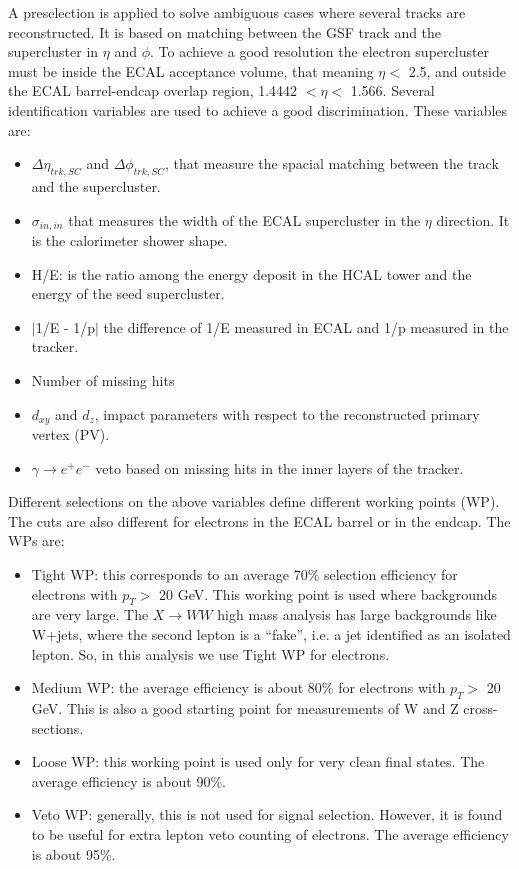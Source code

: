 A preselection is applied to solve ambiguous cases where several tracks are reconstructed. It is based on matching
between the GSF track and the supercluster in $\eta$ and $\phi$. To achieve a good resolution the electron supercluster must
be inside the ECAL acceptance volume, that meaning  $\eta<$ 2.5, and outside the ECAL barrel-endcap
overlap region, 1.4442 $<\eta<$ 1.566.
Several identification variables are used to achieve a good discrimination. These variables are:
\begin{itemize}
\item $\Delta \eta_{trk,SC}$ and $\Delta \phi_{trk,SC}$, that measure the spacial matching between the track
and the supercluster.
\item $\sigma_{in,in}$ that measures the width of the ECAL supercluster in the $\eta$ direction. It is the calorimeter shower shape.
\item H/E: is the ratio among the energy deposit in the HCAL tower and the energy of the seed supercluster.
\item $|$1/E - 1/p$|$ the difference of 1/E measured in ECAL and 1/p measured in the tracker.
\item Number of missing hits
\item $d_{xy}$ and $d_z$, impact parameters with respect to the reconstructed primary vertex (PV).
\item $\gamma \to e^+ e^-$ veto based on missing hits in the inner layers of the tracker.
\end{itemize}
Different selections on the above variables define different working points (WP). The cuts are also different for electrons in
the ECAL barrel or in the endcap. The WPs are:
\begin{itemize}
\item Tight WP: this corresponds to an average 70\% selection efficiency for electrons with
$p_T >$ 20 GeV. This working point is used where backgrounds are very large. The
$X \to WW$ high mass analysis has large backgrounds like W+jets, where the second lepton is a ``fake'', i.e. a jet identified as an isolated lepton. 
So, in this analysis we use Tight WP for electrons. %
\item Medium WP: the average efficiency is about 80\% for electrons with $p_T>$ 20
GeV. This is also a good starting point for measurements of W and Z cross-sections.
\item Loose WP: this working point is used only for very clean final states. The average efficiency is about 90\%.
\item Veto WP: generally, this is not used for signal selection. However, it is found to
be useful for extra lepton veto counting of electrons. The average efficiency is about 95\%.
\end{itemize}

